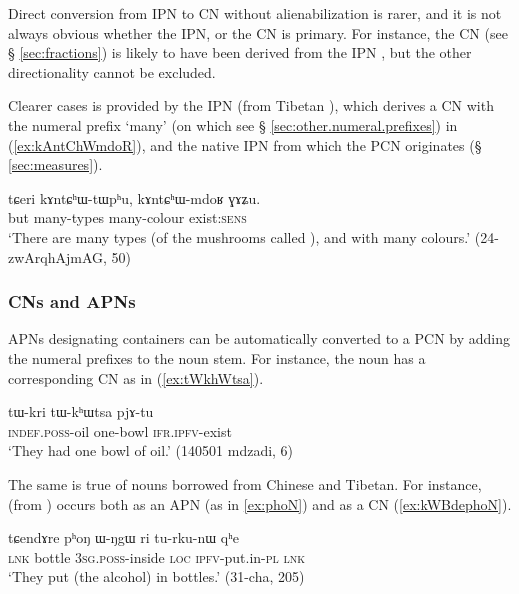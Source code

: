 Direct conversion from IPN to CN without alienabilization is rarer, and it is not always obvious whether the IPN, or the CN is primary. For instance, the CN  (see § \ref{sec:fractions}) is likely to have been derived from the IPN , but the other directionality cannot be excluded. 

Clearer cases is provided by the IPN   (from Tibetan ), which derives a CN with the numeral prefix  `many' (on which see § \ref{sec:other.numeral.prefixes}) in (\ref{ex:kAntChWmdoR}), and the native IPN  from which the PCN  originates (§ \ref{sec:measures}).

\begin{exe}
\ex \label{ex:kAntChWmdoR}
\gll  tɕeri kɤntɕʰɯ-tɯpʰu, kɤntɕʰɯ-mdoʁ ɣɤʑu. \\
 but many-types many-colour exist:\textsc{sens} \\
\glt  `There are many types (of the mushrooms called ), and with many colours.' (24-zwArqhAjmAG, 50)
\end{exe}

\subsubsection{CNs and APNs}   \label{sec:CN.APN}
APNs designating containers can be automatically converted to a PCN by adding the numeral prefixes to the noun stem. For instance, the noun  has a corresponding CN   as in (\ref{ex:tWkhWtsa}).

 
\begin{exe}
\ex \label{ex:tWkhWtsa}
\gll tɯ-kri tɯ-kʰɯtsa pjɤ-tu \\
\textsc{indef}.\textsc{poss}-oil  one-bowl \textsc{ifr}.\textsc{ipfv}-exist \\
\glt `They had one bowl of oil.' (140501 mdzadi, 6)
\end{exe}

The same is true of nouns borrowed from Chinese and Tibetan. For instance,  (from ) occurs both as an APN (as in \ref{ex:phoN}) and as a CN (\ref{ex:kWBdephoN}).

\begin{exe}
\ex \label{ex:phoN}
\gll  tɕendɤre pʰoŋ ɯ-ŋgɯ ri tu-rku-nɯ qʰe \\
\textsc{lnk} bottle \textsc{3sg}.\textsc{poss}-inside \textsc{loc} \textsc{ipfv}-put.in-\textsc{pl} \textsc{lnk} \\
\glt `They put (the alcohol) in bottles.' (31-cha, 205)
\end{exe}

